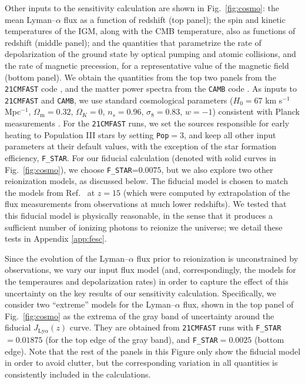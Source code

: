 Other inputs to the sensitivity calculation are shown in Fig.~\ref{fig:cosmo}: the mean Lyman--$\alpha$ flux as a function of redshift (top panel); the spin and kinetic temperatures of the IGM, along with the CMB temperature, also as functions of redshift (middle panel); and the quantities that parametrize the rate of depolarization of the ground state by optical pumping and atomic collisions, and the rate of magnetic precession, for a representative value of the magnetic field (bottom panel). We obtain the quantities from the top two panels from the \texttt{21CMFAST} code \cite{2011MNRAS.411..955M}, and the matter power spectra from the \texttt{CAMB} code \cite{2000ApJ...538..473L}. As inputs to \texttt{21CMFAST} and \texttt{CAMB}, we use standard cosmological parameters ($H_0=67$ km s$^{-1}$ Mpc$^{-1}$, $\Omega_\text{m}=0.32$, $\Omega_K=0$, $n_s=0.96$, $\sigma_8=0.83$, $w=-1$) consistent with Planck measurements \cite{2015arXiv150201589P}. For the \texttt{21CMFAST} runs, we set the sources responsible for early heating to Population III stars by setting \verb|Pop|$=3$, and keep all other input parameters at their default values, with the exception of the star formation efficiency, \verb|F_STAR|. For our fiducial calculation (denoted with solid curves in Fig.~\ref{fig:cosmo}), we choose \verb|F_STAR|=$0.0075$, but we also explore two other reionization models, as discussed below. The fiducial model is chosen to match the models from Ref.~\cite{2012ApJ...746..125H} at $z=15$ (which were computed by extrapolation of the flux measurements from observations at much lower redshifts). We tested that this fiducial model is physically reasonable, in the sense that it produces a sufficient number of ionizing photons to reionize the universe; we detail these tests in Appendix \ref{app:fesc}. 

Since the evolution of the Lyman--$\alpha$ flux prior to reionization is unconstrained by observations, we vary our input flux model (and, correspondingly, the models for the temperaures and depolarization rates) in order to capture the effect of this uncertainty on the key results of our sensitivity calculation. Specifically, we consider two ``extreme'' models for the Lyman--$\alpha$ flux, shown in the top panel of Fig.~\ref{fig:cosmo} as the extrema of the gray band of uncertainty around the fiducial $J_{\text{Ly}\alpha}(z)$ curve. They are obtained from \texttt{21CMFAST} runs with \verb|F_STAR|$=0.01875$  (for the top edge of the gray band), and \verb|F_STAR|$=0.0025$ (bottom edge).  Note that the rest of the panels in this Figure only show the fiducial model in order to avoid clutter, but the corresponding variation in all quantities is consistently included in the calculations. 

